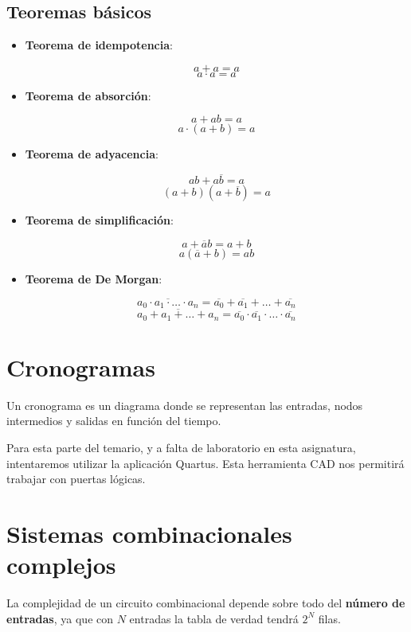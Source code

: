 \documentclass[a4paper]{book}
\begin{document}
\subsection{Teoremas básicos}

\begin{itemize}
	\item \textbf{Teorema de idempotencia}:
	      \begin{multicols}{2}
		      \[\boxed{a + a = a }\]
		      \[\boxed{ a \cdot  a = a}\]
	      \end{multicols}
	\item \textbf{Teorema de absorción}:
	      \begin{multicols}{2}
		      \[\boxed{a + ab = a}\]
		      \[\boxed{ a \cdot  (a+b) = a}\]
	      \end{multicols}
	\item \textbf{Teorema de adyacencia}:
	      \begin{multicols}{2}
		      \[\boxed{ab + a\overline{b} = a}\]
		      \[\boxed{ (a+b)(a+\overline{b}) = a}\]
	      \end{multicols}
	\item \textbf{Teorema de simplificación}:
	      \begin{multicols}{2}
		      \[\boxed{a + \overline{a}b = a + b}\]
		      \[\boxed{ a (\overline{a}+b) = ab}\]
	      \end{multicols}
	\item \textbf{Teorema de De Morgan}:
	      \begin{multicols}{2}
		      \[\boxed{\overline{a_0 \cdot a_1\cdot \ldots \cdot a_n} = \overline{a_0} + \overline{a_1} + \ldots + \overline{a_n}}\]
		      \[\boxed{ \overline{a_0 + a_1+ \ldots + a_n} = \overline{a_0} \cdot  \overline{a_1} \cdot  \ldots \cdot  \overline{a_n} }\]
	      \end{multicols}
\end{itemize}

\section{Cronogramas}
Un cronograma es un diagrama donde se representan las entradas, nodos intermedios y salidas en función del tiempo.

Para esta parte del temario, y a falta de laboratorio en esta asignatura, intentaremos utilizar la aplicación Quartus. Esta herramienta CAD nos permitirá trabajar con puertas lógicas.


\section{Sistemas combinacionales complejos}
La complejidad de un circuito combinacional depende sobre todo del \textbf{número de entradas}, ya que con $N$ entradas la tabla de verdad tendrá $2^N$ filas.
\end{document}
